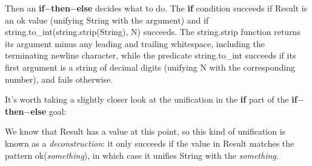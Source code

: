 \documentclass[a4paper,11pt,notitlepage,onecolumn]{book}
\begin{document}
Then an \textsf{\textbf{if}{\ensuremath{-}}\textbf{then}{\ensuremath{-}}\textbf{else}} decides what to do.  The \textsf{\textbf{if}} condition succeeds
if \textsf{Result} is an \textsf{ok} value (unifying \textsf{String} with the argument) and
if \\ \textsf{string.to\_int(string.strip(String), N)} succeeds.  The \textsf{string.strip}
function returns its argument minus any leading and trailing whitespace,
including the terminating newline character, while the predicate
\textsf{string.to\_int} succeeds if its first argument is a string of decimal digits
(unifying \textsf{N} with the corresponding number), and fails otherwise.

It's worth taking a slightly closer look at the unification in the \textsf{\textbf{if}} part
of the \textsf{\textbf{if}{\ensuremath{-}}\textbf{then}{\ensuremath{-}}\textbf{else}} goal:
\begin{small}

\begin{ptabular}
\nextline
\end{ptabular}

\end{small}
We know that \textsf{Result} has a value at this point, so this kind of unification
is known as a \emph{deconstruction}: it only succeeds if the value in
\textsf{Result} matches the pattern \textsf{ok(}\emph{something}\textsf{)}, in which case it
unifies \textsf{String} with the \emph{something}.
\end{document}
